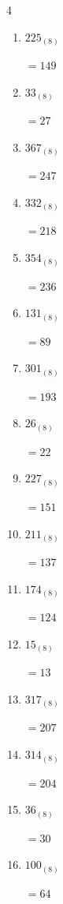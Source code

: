 \begin{multicols}{4}
\begin{enumerate}
        $=200$

  \item $225_{(8)}$

        $=149$

  \item $33_{(8)}$

        $=27$

  \item $367_{(8)}$

        $=247$

  \item $332_{(8)}$

        $=218$

  \item $354_{(8)}$

        $=236$

  \item $131_{(8)}$

        $=89$

  \item $301_{(8)}$

        $=193$

  \item $26_{(8)}$

        $=22$

  \item $227_{(8)}$

        $=151$

  \item $211_{(8)}$

        $=137$

  \item $174_{(8)}$

        $=124$

\columnbreak %

  \item $15_{(8)}$

        $=13$

  \item $317_{(8)}$

        $=207$

  \item $314_{(8)}$

        $=204$

  \item $36_{(8)}$

        $=30$

  \item $100_{(8)}$

        $=64$


\end{enumerate}
\end{multicols}
